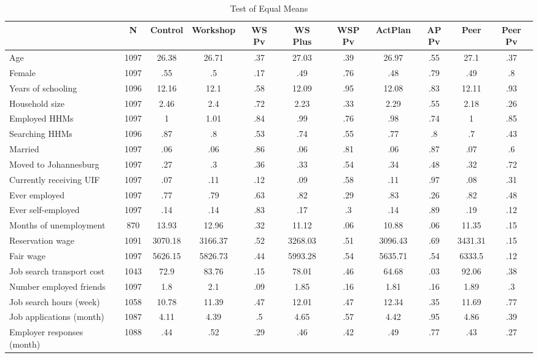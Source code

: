 \begin{table}[htbp]
\caption{\label{clabel} Test of Equal Means \label{tab:balance}}\centering\medskip
\begin{tabular}{lcccccccccc} \hline \hline
 & N  & Control  & Workshop  & WS Pv  & WS Plus  & WSP Pv  & ActPlan  & AP Pv  & Peer  & Peer Pv  \\  \hline 
Age & 1097 & 26.38 & 26.71 & .37 & 27.03 & .39 & 26.97 & .55 & 27.1 & .37 \\  
Female & 1097 & .55 & .5 & .17 & .49 & .76 & .48 & .79 & .49 & .8 \\  
Years of schooling & 1096 & 12.16 & 12.1 & .58 & 12.09 & .95 & 12.08 & .83 & 12.11 & .93 \\  
Household size & 1097 & 2.46 & 2.4 & .72 & 2.23 & .33 & 2.29 & .55 & 2.18 & .26 \\  
Employed HHMs & 1097 & 1 & 1.01 & .84 & .99 & .76 & .98 & .74 & 1 & .85 \\  
Searching HHMs & 1096 & .87 & .8 & .53 & .74 & .55 & .77 & .8 & .7 & .43 \\  
Married & 1097 & .06 & .06 & .86 & .06 & .81 & .06 & .87 & .07 & .6 \\  
Moved to Johannesburg & 1097 & .27 & .3 & .36 & .33 & .54 & .34 & .48 & .32 & .72 \\  
Currently receiving UIF & 1097 & .07 & .11 & .12 & .09 & .58 & .11 & .97 & .08 & .31 \\  
Ever employed & 1097 & .77 & .79 & .63 & .82 & .29 & .83 & .26 & .82 & .48 \\  
Ever self-employed & 1097 & .14 & .14 & .83 & .17 & .3 & .14 & .89 & .19 & .12 \\  
Months of unemployment & 870 & 13.93 & 12.96 & .32 & 11.12 & .06 & 10.88 & .06 & 11.35 & .15 \\  
Reservation wage & 1091 & 3070.18 & 3166.37 & .52 & 3268.03 & .51 & 3096.43 & .69 & 3431.31 & .15 \\  
Fair wage & 1097 & 5626.15 & 5826.73 & .44 & 5993.28 & .54 & 5635.71 & .54 & 6333.5 & .12 \\  
Job search transport cost & 1043 & 72.9 & 83.76 & .15 & 78.01 & .46 & 64.68 & .03 & 92.06 & .38 \\  
Number employed friends & 1097 & 1.8 & 2.1 & .09 & 1.85 & .16 & 1.81 & .16 & 1.89 & .3 \\  
Job search hours (week) & 1058 & 10.78 & 11.39 & .47 & 12.01 & .47 & 12.34 & .35 & 11.69 & .77 \\  
Job applications (month) & 1087 & 4.11 & 4.39 & .5 & 4.65 & .57 & 4.42 & .95 & 4.86 & .39 \\  
Employer responses (month) & 1088 & .44 & .52 & .29 & .46 & .42 & .49 & .77 & .43 & .27 \\  
\hline \hline \end{tabular}
\end{table}

